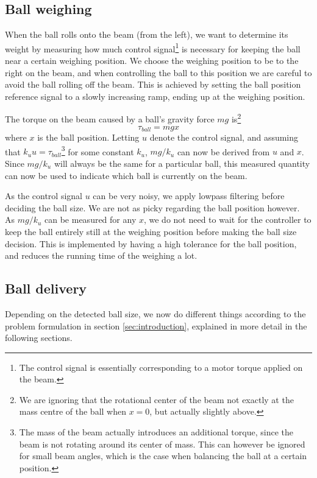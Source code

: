 \subsection{Ball weighing}\label{sec:ball_weighing}
When the ball rolls onto the beam (from the left), we want to determine its weight by measuring how much control signal\footnote{The control signal is essentially corresponding to a motor torque applied on the beam.} is necessary for keeping the ball near a certain weighing position.
We choose the weighing position to be to the right on the beam, and when controlling the ball to this position we are careful to avoid the ball rolling off the beam.
This is achieved by setting the ball position reference signal to a slowly increasing ramp, ending up at the weighing position.

The torque on the beam caused by a ball's gravity force $mg$ is\footnote{We are ignoring that the rotational center of the beam not exactly at the mass centre of the ball when $x=0$, but actually slightly above.}
\[
\tau_{ball} = mgx
\]
where $x$ is the ball position. Letting $u$ denote the control signal, and assuming that $k_u u = \tau_{ball}$\footnote{The mass of the beam actually introduces an additional torque, since the beam is not rotating around its center of mass.
This can however be ignored for small beam angles, which is the case when balancing the ball at a certain position.} for some constant $k_u$, $mg/k_u$ can now be derived from $u$ and $x$.
Since $mg/k_u$ will always be the same for a particular ball, this measured quantity can now be used to indicate which ball is currently on the beam.

As the control signal $u$ can be very noisy, we apply lowpass filtering before deciding the ball size.
We are not as picky regarding the ball position however.
As $mg/k_u$ can be measured for any $x$, we do not need to wait for the controller to keep the ball entirely still at the weighing position before making the ball size decision.
This is implemented by having a high tolerance for the ball position, and reduces the running time of the weighing a lot.

\subsection{Ball delivery}\label{sec:ball_delivery}
Depending on the detected ball size, we now do different things according to the problem formulation in section \ref{sec:introduction}, explained in more detail in the following sections.

